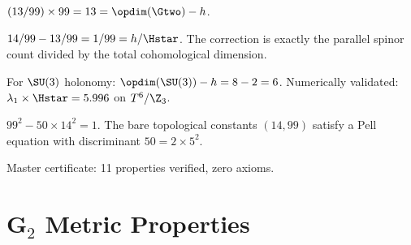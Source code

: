 \begin{theorem}\label{thm:spectral_holonomy_corrected}
    \leanok
    $(13/99) \times 99 = 13 = \opdim(\Gtwo) - h$.
\end{theorem}

\begin{theorem}\label{thm:bare_minus_physical}
    \leanok
    $14/99 - 13/99 = 1/99 = h/\Hstar$. The correction is exactly the
    parallel spinor count divided by the total cohomological dimension.
\end{theorem}

\begin{theorem}\label{thm:SU3_spectral}
    \leanok
    For $\SU(3)$ holonomy: $\opdim(\SU(3)) - h = 8 - 2 = 6$.
    Numerically validated: $\lambda_1 \times \Hstar = 5.996$ on $T^6/\Z_3$.
\end{theorem}

\begin{theorem}\label{thm:pell_equation}
    \leanok
    $99^2 - 50 \times 14^2 = 1$. The bare topological constants $(14, 99)$
    satisfy a Pell equation with discriminant $50 = 2 \times 5^2$.
\end{theorem}

\begin{theorem}\label{thm:physical_gap_cert}
    \leanok
    Master certificate: 11 properties verified, zero axioms.
\end{theorem}

\chapter{G\texorpdfstring{$_2$}{2} Metric Properties}\label{chap:g2metric}

